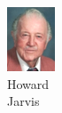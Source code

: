 \begin{figure}[H]
\begin{subfigure}[b]{0.1\textwidth}
                \includegraphics[width=\textwidth]{mugs/JarvisHoward}
                \caption*{Howard \\ Jarvis}
        \end{subfigure}
                ~ %
        \begin{subfigure}[b]{0.1\textwidth}

\end{subfigure}
\end{figure}
